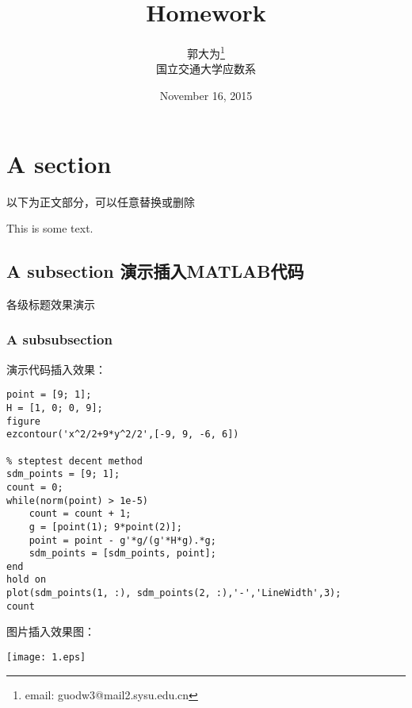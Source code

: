 \documentclass[10pt,a4paper]{article}
\author{郭大为\footnote{email: guodw3@mail2.sysu.edu.cn}\\[2ex]
    国立交通大学应数系\\[2ex]}
\title{Homework \uppercase\expandafter{\romannumeral4}}
\date{November 16, 2015}
\begin{document}
\makeatletter
\let\@afterindentfalse\@afterindenttrue
\@afterindenttrue
\makeatother
\setlength{\parindent}{2em}  %

\maketitle

\section{A section}
以下为正文部分，可以任意替换或删除

This is some text.

\subsection{A subsection 演示插入MATLAB代码}
各级标题效果演示
\subsubsection{A subsubsection}
演示代码插入效果：
\begin{lstlisting}[title=sd\_method.m, frame=shadowbox]
point = [9; 1];
H = [1, 0; 0, 9];
figure
ezcontour('x^2/2+9*y^2/2',[-9, 9, -6, 6])

% steptest decent method
sdm_points = [9; 1];
count = 0;
while(norm(point) > 1e-5)
    count = count + 1;
    g = [point(1); 9*point(2)];
    point = point - g'*g/(g'*H*g).*g;
    sdm_points = [sdm_points, point];
end
hold on
plot(sdm_points(1, :), sdm_points(2, :),'-','LineWidth',3);
count
\end{lstlisting}
图片插入效果图：
    \begin{center}
		\texttt{[image: 1.eps]}
	\end{center}
\end{document}

